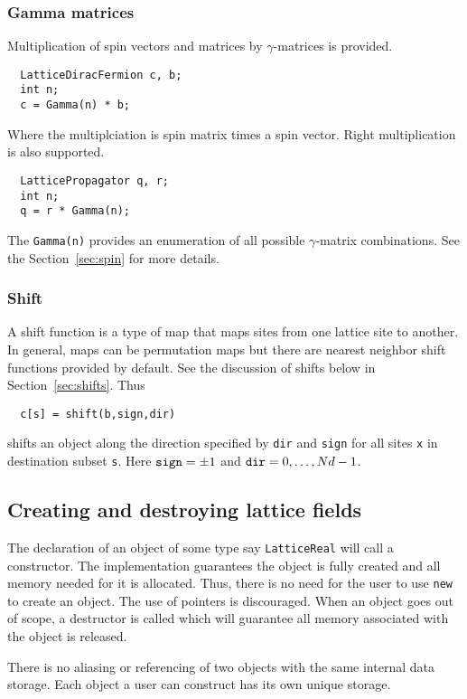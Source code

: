 \documentclass[12pt,letterpaper]{article}
\begin{document}
\subsubsection{Gamma matrices}

Multiplication of spin vectors and matrices by $\gamma$-matrices is provided.
%
\begin{verbatim}
  LatticeDiracFermion c, b;
  int n;
  c = Gamma(n) * b;
\end{verbatim}
%
Where the multiplciation is spin matrix times a spin vector. Right multiplication
is also supported.
\begin{verbatim}
  LatticePropagator q, r;
  int n;
  q = r * Gamma(n);
\end{verbatim}

The \verb|Gamma(n)| provides an enumeration of all possible
$\gamma$-matrix combinations.  See the Section~\ref{sec:spin} for more
details.

\subsubsection{Shift}

A shift function is a type of map that maps sites from one lattice
site to another. In general, maps can be permutation maps but there
are nearest neighbor shift functions provided by default.
See the discussion of shifts below
in Section~\ref{sec:shifts}.
Thus
%
\begin{verbatim}
  c[s] = shift(b,sign,dir)
\end{verbatim}
%
shifts an object along the direction specified by \verb|dir| and 
\verb|sign| for all sites \verb|x| in destination subset \verb|s|.
Here ${\tt sign} = \pm 1$ and ${\tt dir} = 0,\ldots, Nd-1$.


\subsection{Creating and destroying lattice fields}

The declaration of an object of some type say {\tt LatticeReal} will
call a constructor. The implementation guarantees the object is fully
created and all memory needed for it is allocated.  Thus, there is no
need for the user to use {\tt new} to create an object. The use of
pointers is discouraged.  When an object goes out of scope, a
destructor is called which will guarantee all memory associated with
the object is released.  

There is no aliasing or referencing of two objects with the same
internal data storage. Each object a user can construct has its own
unique storage.
\end{document}
